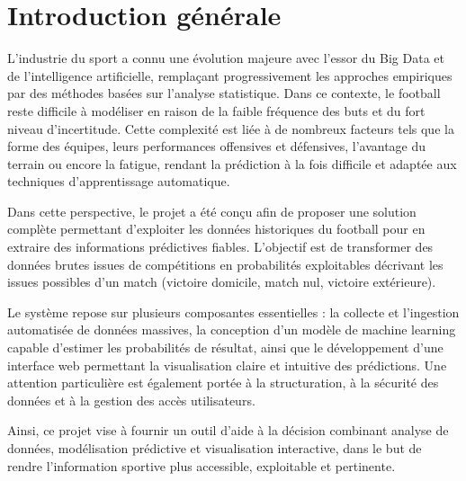 \chapter*{Introduction générale}


L’industrie du sport a connu une évolution majeure avec l’essor du Big Data et de l’intelligence artificielle, remplaçant progressivement les approches empiriques par des méthodes basées sur l’analyse statistique. Dans ce contexte, le football reste difficile à modéliser en raison de la faible fréquence des buts et du fort niveau d’incertitude. Cette complexité est liée à de nombreux facteurs tels que la forme des équipes, leurs performances offensives et défensives, l’avantage du terrain ou encore la fatigue, rendant la prédiction à la fois difficile et adaptée aux techniques d’apprentissage automatique.


Dans cette perspective, le projet a été conçu afin de proposer une solution complète permettant d’exploiter les données historiques du football pour en extraire des informations prédictives fiables. L’objectif est de transformer des données brutes issues de compétitions en probabilités exploitables décrivant les issues possibles d’un match (victoire domicile, match nul, victoire extérieure).

Le système repose sur plusieurs composantes essentielles : la collecte et l’ingestion automatisée de données massives, la conception d’un modèle de machine learning capable d’estimer les probabilités de résultat, ainsi que le développement d’une interface web permettant la visualisation claire et intuitive des prédictions. Une attention particulière est également portée à la structuration, à la sécurité des données et à la gestion des accès utilisateurs.

Ainsi, ce projet vise à fournir un outil d’aide à la décision combinant analyse de données, modélisation prédictive et visualisation interactive, dans le but de rendre l’information sportive plus accessible, exploitable et pertinente.
